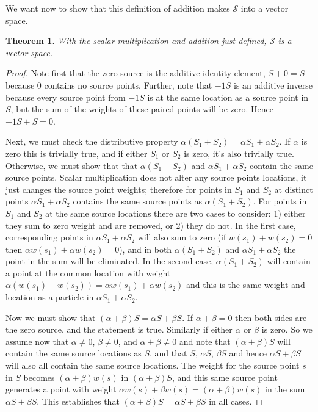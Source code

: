 \documentclass[12pt]{article}
\newtheorem{theorem}{Theorem}
\begin{document}
We want now to show that this definition of addition makes $\mathcal{S}$ into a vector space.  
\begin{theorem}
With the scalar multiplication and addition just defined, $\mathcal{S}$ is a vector space.
\end{theorem}

\begin{proof}
Note first that the zero source is the additive identity element, $S + 0 = S$ because $0$ contains no source points.  Further, note that $-1 S$ is an additive inverse because every source point from $-1 S$ is at the same location as a source point in $S$, but the sum of the weights of these paired points will be zero.  Hence $-1 S + S = 0$.

Next, we must check the distributive property $\alpha (S_1 + S_2) = \alpha S_1 + \alpha S_2$.  If $\alpha$ is zero this is trivially true, and if either $S_1$ or $S_2$ is zero, it's also trivially true.  Otherwise, we must show that that $\alpha(S_1 + S_2)$ and $\alpha S_1 + \alpha S_2$ contain the same source points.  Scalar multiplication does not alter any source points locations, it just changes the source point weights; therefore for points in $S_1$ and $S_2$ at distinct points  $\alpha S_1 + \alpha S_2$ contains the same source points as $\alpha (S_1 + S_2)$.  For points in $S_1$ and $S_2$ at the same source locations there are two cases to consider: 1) either they sum to zero weight and are removed, or 2) they do not.  In the first case, corresponding points in $\alpha S_1 + \alpha S_2$ will also sum to zero (if $w(s_1) + w(s_2) = 0$ then $\alpha w(s_1) + \alpha w(s_2) = 0$), and in both  $\alpha (S_1 + S_2)$ and $\alpha S_1 + \alpha S_2$ the point in the sum will be eliminated.  In the second case, $\alpha(S_1 + S_2)$ will contain a point at the common location with weight $\alpha(w(s_1) + w(s_2)) = \alpha w(s_1) + \alpha w(s_2)$ and this is the same weight and location as a particle in $\alpha S_1 + \alpha S_2$.

Now we must show that $(\alpha + \beta) S = \alpha S + \beta S$.  If $\alpha + \beta = 0$ then both sides are the zero source, and the statement is true. Similarly if either $\alpha$ or $\beta$ is zero.  So we assume now that $\alpha \ne0$, $\beta \ne 0$, and $\alpha + \beta \ne 0$ and note that $(\alpha + \beta)S$ will contain the same source locations as $S$, and that $S$, $\alpha S$, $\beta S$ and hence $\alpha S + \beta S$ will also all contain the same source locations.  The weight for the source point $s$ in $S$ becomes $(\alpha + \beta) w(s)$ in $(\alpha + \beta) S$, and this same source point generates a point with weight $\alpha w(s) + \beta w(s) = (\alpha + \beta) w(s)$ in the sum $\alpha S + \beta S$.  This establishes that $(\alpha + \beta) S = \alpha S + \beta S$ in all cases.


\end{proof}
\end{document}

